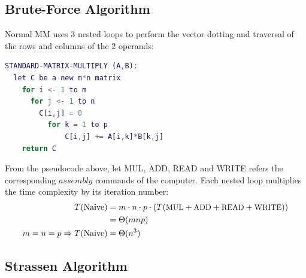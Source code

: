 \documentclass[UTF8]{ctexart}
\begin{document}
\subsection{Brute-Force Algorithm}
\label{subsec::BFA}
Normal MM uses 3 nested loops to perform the vector dotting and traversal of the rows and columns of the 2 operands:
\begin{lstlisting}[language=matlab,style=pseudocode]
  STANDARD-MATRIX-MULTIPLY (A,B):
  let C be a new m*n matrix
    for i <- 1 to m
      for j <- 1 to n
        C[i,j] = 0
          for k = 1 to p
              C[i,j] += A[i,k]*B[k,j]
    return C
\end{lstlisting}
From the pseudocode above, let MUL, ADD, READ and WRITE refers the corresponding \(assembly\) commands of the computer.
Each nested loop multiplies the time complexity by its iteration number:
\begin{equation}
  \begin{aligned}
    T(\text{Naive})                  & =m\cdot n\cdot p\cdot (T(\text{\small MUL}+\text{\small ADD}+\text{\small READ}+\text{\small WRITE})) \\
                                     & =\Theta(mnp)                                                                                          \\
    m=n=p\Rightarrow T(\text{Naive}) & =\Theta(n^{3})
  \end{aligned}
\end{equation}

\subsection{Strassen Algorithm}
\label{subsec::STA}
\end{document}
